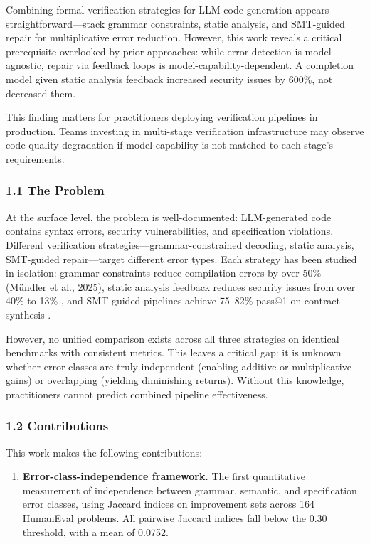 
Combining formal verification strategies for LLM code generation appears straightforward---stack grammar constraints, static analysis, and SMT-guided repair for multiplicative error reduction. However, this work reveals a critical prerequisite overlooked by prior approaches: while error detection is model-agnostic, repair via feedback loops is model-capability-dependent. A completion model given static analysis feedback increased security issues by 600\%, not decreased them.

This finding matters for practitioners deploying verification pipelines in production. Teams investing in multi-stage verification infrastructure may observe code quality degradation if model capability is not matched to each stage's requirements.

\subsubsection{1.1 The Problem}

At the surface level, the problem is well-documented: LLM-generated code contains syntax errors, security vulnerabilities, and specification violations. Different verification strategies---grammar-constrained decoding, static analysis, SMT-guided repair---target different error types. Each strategy has been studied in isolation: grammar constraints reduce compilation errors by over 50\% (Mündler et al., 2025), static analysis feedback reduces security issues from over 40\% to 13\% \citep{blyth2025static}, and SMT-guided pipelines achieve 75--82\% pass@1 on contract synthesis \citep{lim2025contracteval}.

However, no unified comparison exists across all three strategies on identical benchmarks with consistent metrics. This leaves a critical gap: it is unknown whether error classes are truly independent (enabling additive or multiplicative gains) or overlapping (yielding diminishing returns). Without this knowledge, practitioners cannot predict combined pipeline effectiveness.

\subsubsection{1.2 Contributions}

This work makes the following contributions:

\begin{enumerate}
\item \textbf{Error-class-independence framework.} The first quantitative measurement of independence between grammar, semantic, and specification error classes, using Jaccard indices on improvement sets across 164 HumanEval problems. All pairwise Jaccard indices fall below the 0.30 threshold, with a mean of 0.0752.
\end{enumerate}

